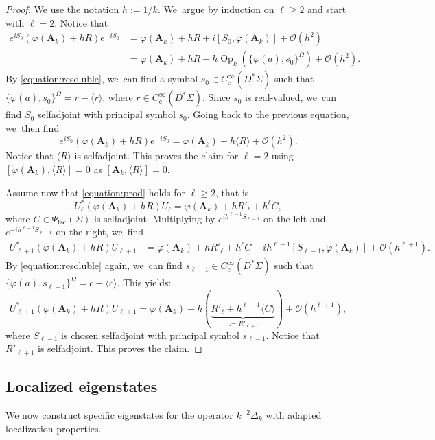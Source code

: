 \documentclass[JEP,XML,SOM,Unicode,published]{cedram}
\newcommand{\bA}{\boldsymbol{A}}
\theoremstyle{plain}
\theoremstyle{definition}
\let\mc\mathcal
\DeclareMathOperator{\comp}{c}
\DeclareMathOperator{\Op}{Op}
\begin{document}
\begin{proof}
We use the notation $h:=1/k$. We~argue by induction on $\ell \geq 2$ and start with $\ell=2$. Notice that
\[
\begin{split}
e^{iS_0}(\varphi(\bA_k) + hR)e^{-iS_0} & = \varphi(\bA_k) + hR + i[S_0,\varphi(\bA_k)] + \mc{O}(h^{2}) \\
& = \varphi(\bA_k) + hR - h\Op_k(\{\varphi(a),s_0\}^\Omega) + \mc{O}(h^{2}).
\end{split}
\]
By \eqref{equation:resoluble}, we~can find a symbol $s_0 \in C^\infty_{{\comp}}(D^*\Sigma)$ such that $\{\varphi(a),s_0\}^\Omega = r-\langle r\rangle$, where $r \in C^\infty_{{\comp}}(D^*\Sigma)$. Since $s_0$ is real-valued, we~can find $S_0$ selfadjoint with principal symbol $s_0$. Going back to the previous equation, we~then find
\[
e^{iS_0}(\varphi(\bA_k) + hR)e^{-iS_0} = \varphi(\bA_k) + h\langle R\rangle + \mc{O}(h^{2}).
\]
Notice that $\langle R \rangle$ is selfadjoint. This proves the claim for $\ell=2$ using $[\varphi(\bA_k),\langle R\rangle]=0$ as $[\bA_k,\langle R\rangle]=0$.

Assume now that \eqref{equation:prod} holds for $\ell \geq 2$, that is
\[
U_{\ell}^* (\varphi(\bA_k) + hR) U_{\ell} = \varphi(\bA_k) + hR'_\ell + h^{\ell} C,
\]
where $C \in \Psi_{\mathrm{tsc}}(\Sigma)$ is selfadjoint. Multiplying by $e^{i h^{\ell-1}S_{\ell-1}}$ on the left and $e^{-i h^{\ell-1}S_{\ell-1}}$ on the right, we~find
\[
\begin{split}
U_{\ell +1}^* (\varphi(\bA_k) + hR) U_{\ell+1} & = \varphi(\bA_k) + hR'_\ell + h^{\ell} C + i h^{\ell-1}[S_{\ell-1}, \varphi(\bA_k)] + \mc{O}(h^{\ell+1}).
\end{split}
\]
By \eqref{equation:resoluble} again, we~can find $s_{\ell-1} \in C^\infty_{{\comp}}(D^*\Sigma)$ such that $\{\varphi(a),s_{\ell-1}\}^\Omega = c-\langle c\rangle$. This yields:
\[
U_{\ell +1}^* (\varphi(\bA_k) + hR) U_{\ell+1} = \varphi(\bA_k) + h(\underbrace{R'_\ell + h^{\ell-1} \langle C\rangle}_{:=R'_{\ell+1}}) + \mc{O}(h^{\ell+1}),
\]
where $S_{\ell-1}$ is chosen selfadjoint with principal symbol $s_{\ell-1}$. Notice that $R'_{\ell +1}$ is selfadjoint. This proves the claim.
\end{proof}

\subsection{Localized eigenstates} \label{ssection:quasimodes} We now construct specific eigenstates for the operator $k^{-2}\Delta_k$ with adapted localization properties.
\end{document}
